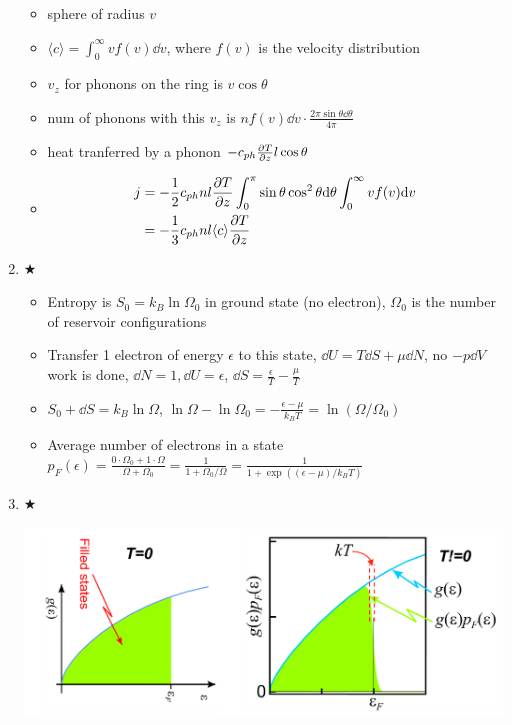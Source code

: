 \documentclass{article}
\theoremstyle{remark}
\theoremstyle{remark}
\newcommand{\myref}[1]{\hyperref[back:#1]{$\bigstar$}\label{#1}}
\begin{document}
\begin{enumerate}
\begin{minipage}{0.3\linewidth}
        \end{minipage}
        \begin{minipage}{0.69\linewidth}
            \begin{itemize}
                \item sphere of radius $v$
                \item $\langle c\rangle=\int_0^\infty vf(v)\dd v$, where $f(v)$ is the velocity distribution
                \item $v_z$ for phonons on the ring is $v\cos\theta$
                \item num of phonons with this $v_z$ is $nf(v)\dd v\cdot \frac{2\pi\sin\theta\dd\theta}{4\pi}$
                \item heat tranferred by a phonon $-c_{ph}\pdv{T}{z}l\cos\theta$
                \item \begin{align*}j &= -\frac{1}{2}c_{ph}nl\pdv{T}{z}\int_0^\pi\sin\theta\cos^2\theta\dd\theta \int_0^\infty vf(v)\dd v \\ &= -\frac{1}{3}c_{ph}nl\langle c\rangle\pdv{T}{z}\end{align*}
            \end{itemize}
        \end{minipage}
    \item \myref{thm:Fermi_Dirac}\begin{itemize}
        \item Entropy is $S_0 = k_B\ln\Omega_0$ in ground state (no electron), $\Omega_0$ is the number of reservoir configurations
        \item Transfer 1 electron of energy $\epsilon$ to this state, $\dd U=T\dd S+\mu\dd N$, no $-p\dd V$ work is done, $\dd N=1,\dd U=\epsilon$, $\dd S=\frac{\epsilon}{T}-\frac{\mu}{T}$
        \item $S_0+\dd S=k_B\ln\Omega$, $\ln\Omega-\ln\Omega_0=-\frac{\epsilon-\mu}{k_BT} = \ln(\Omega/\Omega_0)$
        \item Average number of electrons in a state $p_F(\epsilon)=\frac{0\cdot\Omega_0+1\cdot\Omega}{\Omega+\Omega_0} = \frac{1}{1+\Omega_0/\Omega} = \frac{1}{1+\exp((\epsilon-\mu)/k_BT)}$
    \end{itemize}
    \item \myref{thm:electronic_heat_capacity}\begin{center}
            \includegraphics*[width=0.6\linewidth]{cmp_Fermi_distri_proof.png}

\end{center}
\end{enumerate}
\end{document}
